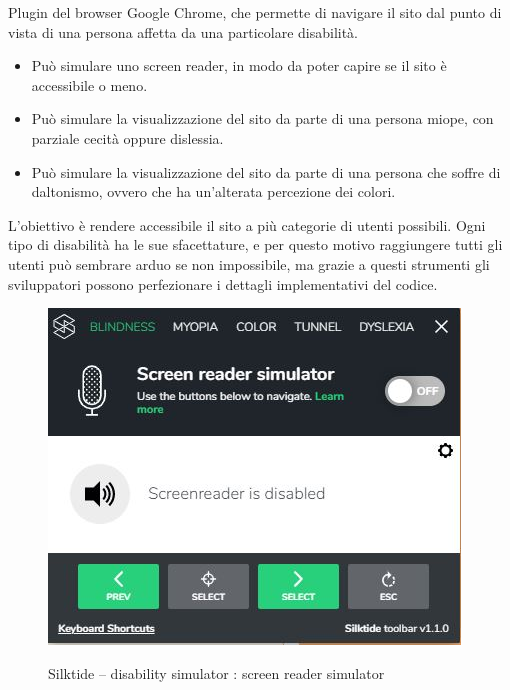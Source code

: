 Plugin del browser Google Chrome, che permette di navigare il sito dal punto di vista di una persona affetta da una particolare disabilità.
\begin{itemize}
	\item Può simulare uno screen reader, in modo da poter capire se il sito è accessibile o meno.
	\item Può simulare la visualizzazione del sito da parte di una persona miope, con parziale cecità oppure dislessia.
	\item Può simulare la visualizzazione del sito da parte di una persona che soffre di daltonismo, ovvero che ha un'alterata percezione dei colori.
\end{itemize}
L'obiettivo è rendere accessibile il sito a più categorie di utenti possibili. Ogni tipo di disabilità ha le sue sfacettature, e per questo motivo 
raggiungere tutti gli utenti può sembrare arduo se non impossibile, ma grazie a questi strumenti gli sviluppatori possono perfezionare i dettagli
implementativi del codice.
\begin{figure}[!h]
	\centering
	\includegraphics[width=0.7\linewidth]{sezioni/FaseTest/Immagini/screen_reader_simulator.JPG}\\
	\caption{Silktide – disability simulator : screen reader simulator}
	\label{Fig:silktide}
\end{figure} 
